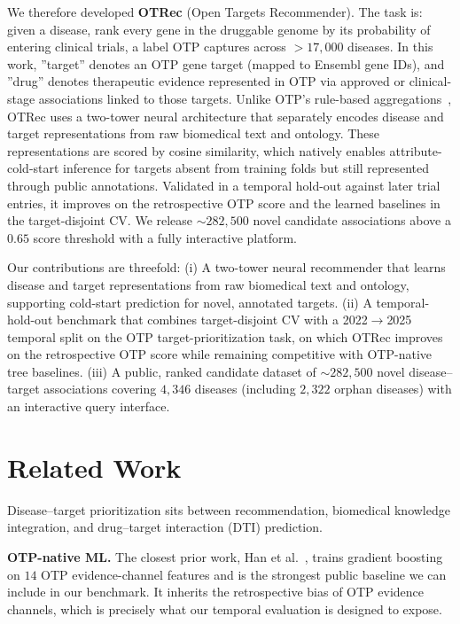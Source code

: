 \documentclass{article}
\begin{document}
We therefore developed \textbf{OTRec} (Open Targets Recommender).
The task is: given a disease, rank every gene in the druggable
genome by its probability of entering clinical trials, a label OTP
 captures across ${>}17{,}000$ diseases.
In this work, ''target'' denotes an OTP gene target (mapped to Ensembl gene IDs),
and ''drug'' denotes therapeutic evidence represented in OTP via approved or
clinical-stage associations linked to those targets. Unlike OTP's rule-based aggregations~\citep{buniello2025}, OTRec uses a
two-tower neural architecture that separately encodes disease and target
representations from raw biomedical text and ontology. These representations
are scored by cosine similarity, which natively enables attribute-cold-start
inference for targets absent from training folds but still represented
through public annotations.
Validated in a temporal hold-out against later trial entries, it improves on the retrospective OTP score and the learned baselines in the target-disjoint CV. We release ${\sim}282{,}500$ novel candidate associations above a $0.65$ score threshold with a fully interactive platform.

Our contributions are threefold:
(i) A two-tower neural recommender that learns disease and target
representations from raw biomedical text and ontology, supporting
cold-start prediction for novel, annotated targets.
(ii) A temporal-hold-out benchmark that combines target-disjoint CV with a 2022$\to$2025 temporal split on the OTP target-prioritization task,
on which OTRec improves on the retrospective OTP score while remaining
competitive with OTP-native tree baselines.
(iii) A public, ranked candidate dataset of ${\sim}282{,}500$ novel
disease--target associations covering $4{,}346$ diseases (including
$2{,}322$ orphan diseases) with an interactive query interface.

\section{Related Work}
\label{sec:related}

Disease--target prioritization sits between recommendation,
biomedical knowledge integration, and drug--target interaction (DTI)
prediction. %

\textbf{OTP-native ML.}
The closest prior work, Han et al.~\citep{han2022}, trains gradient
boosting on $14$ OTP evidence-channel features and is the strongest
public baseline we can include in our benchmark.
It inherits the retrospective bias of OTP evidence channels, which is
precisely what our temporal evaluation is designed to expose.
\end{document}
